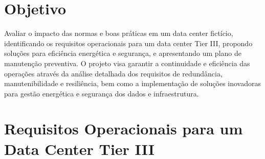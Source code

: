 \documentclass[
	12pt,				%
	oneside,			%
	a4paper,			%
	english,			%
	brazil				%
	]{abntex2unama}
\begin{document}
\frenchspacing


%
% 
%
\imprimircapa

\tableofcontents*
\cleardoublepage



\textual



% 
%
%
\chapter{Objetivo}
Avaliar o impacto das normas e boas práticas em um data center fictício, identificando os requisitos operacionais para um data center Tier III, propondo soluções para eficiência energética e segurança, e apresentando um plano de manutenção preventiva. O projeto visa garantir a continuidade e eficiência das operações através da análise detalhada dos requisitos de redundância, manutenibilidade e resiliência, bem como a implementação de soluções inovadoras para gestão energética e segurança dos dados e infraestrutura.

\chapter{Requisitos Operacionais para um Data Center Tier III}
\end{document}
